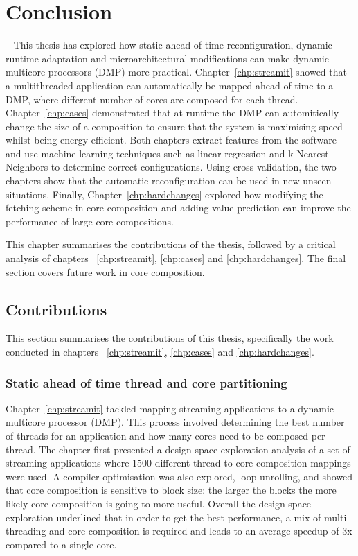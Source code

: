 \chapter{Conclusion}~\label{chp:conclusion}
This thesis has explored how static ahead of time reconfiguration, dynamic runtime adaptation and microarchitectural modifications can make dynamic multicore processors (DMP) more practical.
Chapter~\ref{chp:streamit} showed that a multithreaded application can automatically be mapped ahead of time to a DMP, where different number of cores are composed for each thread.
Chapter~\ref{chp:cases} demonstrated that at runtime the DMP can automitically change the size of a composition to ensure that the system is maximising speed whilst being energy efficient.
Both chapters extract features from the software and use machine learning techniques such as linear regression and k Nearest Neighbors to determine correct configurations.
Using cross-validation, the two chapters show that the automatic reconfiguration can be used in new unseen situations.
Finally, Chapter~\ref{chp:hardchanges} explored how modifying the fetching scheme in core composition and adding value prediction can improve the performance of large core compositions.

This chapter summarises the contributions of the thesis, followed by a critical analysis of chapters ~\ref{chp:streamit}, \ref{chp:cases} and \ref{chp:hardchanges}.
The final section covers future work in core composition.

\section{Contributions}
This section summarises the contributions of this thesis, specifically the work conducted in chapters  ~\ref{chp:streamit}, \ref{chp:cases} and \ref{chp:hardchanges}.
\subsection{Static ahead of time thread and core partitioning}

Chapter~\ref{chp:streamit} tackled mapping streaming applications to a dynamic multicore processor (DMP).
This process involved determining the best number of threads for an application and how many cores need to be composed per thread.
The chapter first presented a design space exploration analysis of a set of streaming applications where 1500 different thread to core composition mappings were used.
A compiler optimisation was also explored, loop unrolling, and showed that core composition is sensitive to block size: the larger the blocks the more likely core composition is going to more useful.
Overall the design space exploration underlined that in order to get the best performance, a mix of multi-threading and core composition is required and leads to an average speedup of 3x compared to a single core.
 
